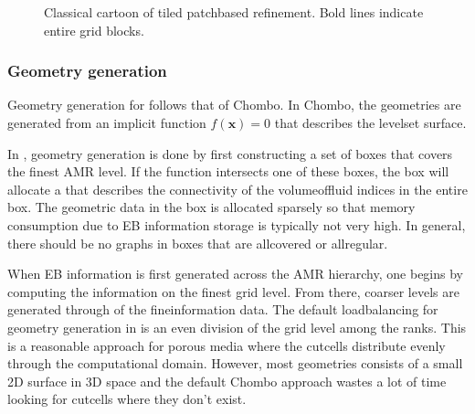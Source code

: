 \documentclass[letterpaper,10pt,english]{sphinxmanual}
\let\sphinxpxdimen\pdfpxdimen\else\newdimen\sphinxpxdimen
\begin{document}
\begin{figure}[htb]
\centering
\capstart

\noindent\sphinxincludegraphics[width=360\sphinxpxdimen]{{tiled}.png}
\caption{Classical cartoon of tiled patch\sphinxhyphen{}based refinement. Bold lines indicate entire grid blocks.}\label{\detokenize{Model:id4}}\end{figure}


\subsubsection{Geometry generation}
\label{\detokenize{Model:geometry-generation}}\label{\detokenize{Model:chap-ebmesh}}
Geometry generation for  follows that of Chombo. In Chombo, the geometries are generated from an implicit function \(f(\mathbf{x}) = 0\) that describes the level\sphinxhyphen{}set surface.

In , geometry generation is done by first constructing a set of boxes that covers the finest AMR level.
If the function intersects one of these boxes, the box will allocate a  that describes the connectivity of the volume\sphinxhyphen{}of\sphinxhyphen{}fluid indices in the entire box.
The geometric data in the box is allocated sparsely so that memory consumption due to EB information storage is typically not very high.
In general, there should be no graphs in boxes that are all\sphinxhyphen{}covered or all\sphinxhyphen{}regular.

When EB information is first generated across the AMR hierarchy, one begins by computing the information on the finest grid level.
From there, coarser levels are generated through  of the fine\sphinxhyphen{}information data.
The default load\sphinxhyphen{}balancing for geometry generation in  is an even division of the grid level among the ranks.
This is a reasonable approach for porous media where the cut\sphinxhyphen{}cells distribute evenly through the computational domain.
However, most geometries consists of a small 2D surface in 3D space and the default Chombo approach wastes a lot of time looking for cut\sphinxhyphen{}cells where they don’t exist.
\end{document}
